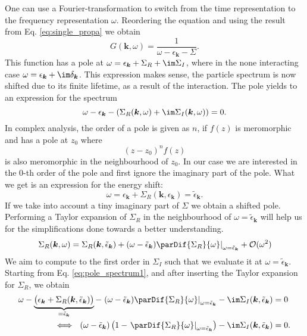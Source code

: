 \documentclass[../main.tex]{subfile}
\begin{document}
One can use a Fourier-transformation to switch from the time representation to the frequency representation $\omega$. Reordering the equation and using the result
from Eq. \ref{eq:single_propa} we obtain
\[
    G(\bm{k},\omega) = \frac{1}{\omega - \epsilon_{\bm{k}} - \Sigma}.
\]
This function has a pole at $\omega = \epsilon_{\bm{k}} + \Sigma_R + \im \Sigma_I$, where in the none interacting case $\omega = \epsilon_{\bm{k}} + \im\delta_{\bm{k}}$.
This expression makes sense, the particle spectrum is now shifted due to its finite lifetime, as a result of the interaction.
The pole yields to an expression for the spectrum
\begin{equation} \label{eq:pole_spectrum1}
    \omega - \epsilon_{\bm{k}} - \left(\Sigma_R(\bm{k},\omega) + \im \Sigma_I(\bm{k},\omega)\right) = 0.
\end{equation}
In complex analysis, the order of a pole is given as $n$, if $f(z)$ is meromorphic and has a pole at $z_0$ where
\[
    (z-z_0)^n f(z)
\]
is also meromorphic in the neighbourhood of $z_0$. In our case we are interested in the 0-th order of the pole and first ignore the imaginary part of the pole.
What we get
is an expression for the energy shift:
\[
    \omega = \epsilon_{\bm{k}} + \Sigma_R(\bm{k}, \epsilon_{\bm{k}}) = \tilde{\epsilon}_{\bm{k}}.  
\]
If we take into account a tiny imaginary part of $\Sigma$ we obtain a shifted pole. Performing a Taylor expansion of 
$\Sigma_{R}$ in the neighbourhood of $\omega = \tilde{\epsilon}_{\bm{k}}$ will help us
for the simplifications done towards a better understanding.
\begin{equation*}
    \left.\Sigma_R(\bm{k}, \omega) = \Sigma_R(\bm{k}, \tilde{\epsilon}_{\bm{k}}) + (\omega - \tilde{\epsilon}_{\bm{k}}) \parDif{\Sigma_R}{\omega}\right|_{\omega= \tilde{\epsilon}_{\bm{k}}} + \mathcal{O}(\omega^2)
\end{equation*}
We aim to compute to the first order in $\Sigma_I$ such that we evaluate it at $\omega = \tilde{\epsilon}_{\bm{k}}$. 
Starting from Eq. \ref{eq:pole_spectrum1}, and after inserting the Taylor expansion for $\Sigma_R$, we obtain
\begin{equation}
    \begin{aligned}
        \omega - \underbrace{\bigl(\epsilon_{\bm{k}} + \Sigma_R(\bm{k}, \tilde{\epsilon}_{\bm{k}})\bigr)}_{=  \tilde{\epsilon}_{\bm{k}}} 
        - \left.(\omega - \tilde{\epsilon}_{\bm{k}}) \parDif{\Sigma_R}{\omega}\right|_{\omega= \tilde{\epsilon}_{\bm{k}}} - \im \Sigma_I(\bm{k}, \tilde{\epsilon}_{\bm{k}}) &= 0\\
        \Longleftrightarrow ~~ (\omega - \tilde{\epsilon}_{\bm{k}}) \left(1 - \left.\parDif{\Sigma_R}{\omega}\right|_{\omega= \tilde{\epsilon}_{\bm{k}}}\right) - \im \Sigma_I(\bm{k}, \tilde{\epsilon}_{\bm{k}}) &= 0.
    \end{aligned}
\end{equation}
\end{document}
